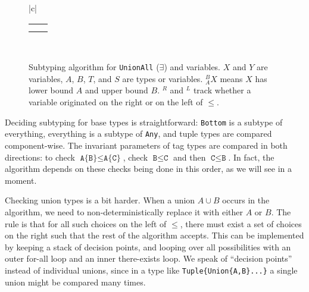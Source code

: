 \begin{figure}[!t]
\begin{center}
\begin{tabular}{|c|}
\begin{tabular}{cc}
        \AxiomC{$^BX^L,{} _AY^L,\Gamma\ \vdash\ B \leq Y\ \vee\ X \leq A$}
        \UnaryInfC{$^BX^L,{} _AY^L,\Gamma\ \vdash\ X \leq Y$}
        \DisplayProof

        \hspace{4ex}

        &

        \AxiomC{$_A^BX^R,{} Y^R,\Gamma\ \vdash\ B \leq A$}
        \UnaryInfC{$_A^BX^R,{} Y^R,\Gamma\ \vdash\ X \leq Y$}
        \DisplayProof

        \\[8pt]

        \AxiomC{$_A^BX^R,\Gamma\ \vdash\ A \leq T$}
        \UnaryInfC{$_A^TX^R,\Gamma\ \vdash\ X \leq T$}
        \DisplayProof

        \hspace{4ex}

        &

        \AxiomC{$_A^BX^R,\Gamma\ \vdash\ T \leq B$}
        \UnaryInfC{$_{A \cup T}^{\ \ \ B}X^R,\Gamma\ \vdash\ T \leq X$}
        \DisplayProof

        \\[8pt]
      \end{tabular}
      \\
      \hline
    \end{tabular}
  \end{center}
  \caption[Subtyping algorithm]{
\small{
    Subtyping algorithm for \texttt{UnionAll} ($\exists$) and variables.
    $X$ and $Y$ are variables, $A$, $B$, $T$, and $S$ are types or variables.
    $_A^BX$ means $X$ has lower bound $A$ and upper bound $B$.
    $^R$ and $^L$ track whether a variable originated on the right or on the left of
    $\leq$.
}
  }
  \label{subtvars}
\end{figure}


Deciding subtyping for base types is straightforward: \texttt{Bottom} is
a subtype of everything, everything is a subtype of \texttt{Any}, and
tuple types are compared component-wise. The invariant parameters
of tag types are compared in both directions: to check
$\texttt{A\{B\}}\leq \texttt{A\{C\}}$, check $\texttt{B}\leq\texttt{C}$ and
then $\texttt{C}\leq\texttt{B}$. In fact, the algorithm depends on these
checks being done in this order, as we will see in a moment.

Checking union types is a bit harder. When a union $A\cup B$ occurs in the
algorithm, we need to non-deterministically replace it with either $A$ or
$B$. The rule is that for all such choices on the left of $\leq$, there
must exist a set of choices on the right such that the rest of the
algorithm accepts. This can be implemented by keeping a stack of
decision points, and looping over all possibilities with an outer
for-all loop and an inner there-exists loop. We speak of ``decision points''
instead of individual unions, since in a type like \texttt{Tuple\{Union\{A,B\}...\}}
a single union might be compared many times.

